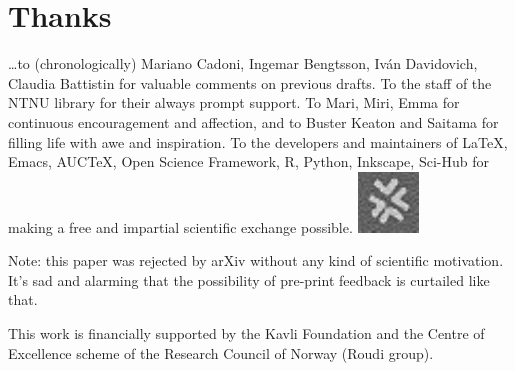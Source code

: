 \documentclass[\ifafour a4paper,12pt,\else a5paper,10pt,\fi%
onecolumn,oneside,article,%
british%
]{memoir}
\theoremstyle{remark}
\theoremstyle{innote}
\renewcommand*{\finalnamedelim}{\addspace\amp\space}
\newcommand*{\amp}{\&}
\newenvironment{acknowledgements}{\section*{Thanks}\addcontentsline{toc}{section}{Thanks}}{\par}
\newcommand*\autanet{\includegraphics[height=\heightof{M}]{autanet.pdf}}
\renewcommand*{\|}[1][]{\nonscript\,#1\vert\nonscript\;\mathopen{}}
\begin{document}
\begin{acknowledgements}
  \ldots to (chronologically) Mariano Cadoni, Ingemar Bengtsson, Iv\'an
  Davidovich, Claudia Battistin for valuable comments on previous drafts.
  To the staff of the NTNU library for their always prompt support. To
  Mari, Miri, Emma for continuous encouragement and affection, and to
  Buster Keaton and Saitama for filling life with awe and inspiration. To
  the developers and maintainers of \LaTeX, Emacs, AUC\TeX, Open Science
  Framework, R, Python, Inkscape, Sci-Hub for making a free and impartial
  scientific exchange possible. \mbox{}\hfill\autanet

  Note: this paper was rejected by arXiv without any kind of scientific
  motivation. It's sad and alarming that the possibility of pre-print
  feedback is curtailed like that.
  
  This work is financially supported by the Kavli Foundation and the Centre
  of Excellence scheme of the Research Council of Norway (Roudi
  group).
\end{acknowledgements}


\renewcommand*{\finalnamedelim}{\addcomma\space}

\printbibliography[prenote=prenote%
]
\end{document}
